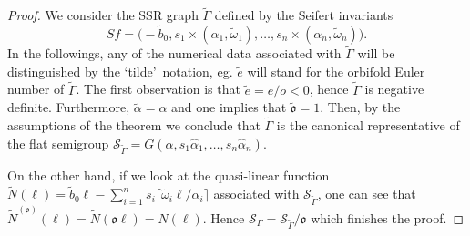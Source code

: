\documentclass[oneside]{amsart}
\numberwithin{equation}{section}
\numberwithin{equation}{subsection}
\theoremstyle{plain}
\theoremstyle{definition}
\newcommand{\calS}{{\mathcal S}}\newcommand{\cals}{{\bf s}}\newcommand{\calst}{{\bf st}}\newcommand{\cS}{{\mathcal S}}
\newcommand{\w}{\omega}
\newcommand{\al}{\alpha}
\newcommand{\Se}{\mathcal{S}}
\newcommand{\G}{\Gamma}
\newcommand{\oo}{\mathfrak{o}}
\begin{document}
\begin{proof}
     We consider the SSR graph $\tilde{\G}$ defined by the Seifert invariants
     \[
       Sf=\big(-\tilde{b}_0,s_1\times(\al_1,\tilde{\w}_1),\dots,s_n\times(\al_n,\tilde{\w}_n)
    \big).     
    \]
    In the followings, any of the numerical data associated with $\tilde{\G}$
    will be distinguished by the \textquoteleft tilde\textquoteright\, notation, 
    eg.  $\tilde{e}$ will stand for the orbifold Euler number of $\tilde{\G}$. The first observation is that $\tilde{e}=e/o<0$, hence $\tilde{\G}$ is negative definite. Furthermore, $\tilde{\al}=\al$ and one implies  that  $\tilde{\oo}=1$. Then, by the assumptions of the theorem we conclude that $\tilde{\G}$ is the canonical representative of the flat semigroup $\calS_{\tilde{\Gamma}}=G(\al,s_1 \widehat{\al}_1,\dots, s_n\widehat{\al}_n)$. 
    
    On the other hand, if we look at the quasi-linear function  $\tilde{N}(\ell)=\tilde{b}_0 \ell -\sum_{i=1}^n s_i\lceil\tilde{\w}_i \ell/\al_i\rceil$ associated with $\calS_{\tilde{\Gamma}}$, one can see that 
    $ \tilde{N}^{(\oo)}(\ell)=\tilde{N}(\oo\ell)=N(\ell)$. Hence $\Se_{\G}=\Se_{\tilde{\G}}/\oo$ which finishes the proof. 
  

    
     
%      
%   
% 
 \end{proof}
\end{document}
